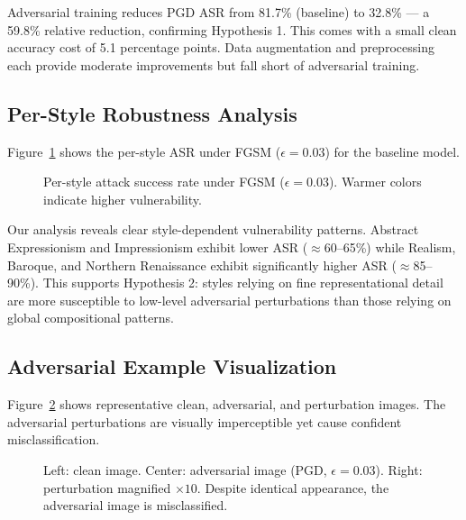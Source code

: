 \documentclass[conference]{IEEEtran}
\begin{document}
Adversarial training reduces PGD ASR from 81.7\% (baseline) to 32.8\% — a 59.8\% relative reduction, confirming Hypothesis 1. This comes with a small clean accuracy cost of 5.1 percentage points. Data augmentation and preprocessing each provide moderate improvements but fall short of adversarial training.

\subsection{Per-Style Robustness Analysis}

Figure~\ref{fig:per_style} shows the per-style ASR under FGSM ($\epsilon = 0.03$) for the baseline model.

\begin{figure}[htbp]
\centering
\caption{Per-style attack success rate under FGSM ($\epsilon=0.03$). Warmer colors indicate higher vulnerability.}
\label{fig:per_style}
\end{figure}

Our analysis reveals clear style-dependent vulnerability patterns. Abstract Expressionism and Impressionism exhibit lower ASR ($\approx$60--65\%) while Realism, Baroque, and Northern Renaissance exhibit significantly higher ASR ($\approx$85--90\%). This supports Hypothesis 2: styles relying on fine representational detail are more susceptible to low-level adversarial perturbations than those relying on global compositional patterns.

\subsection{Adversarial Example Visualization}

Figure~\ref{fig:adv_examples} shows representative clean, adversarial, and perturbation images. The adversarial perturbations are visually imperceptible yet cause confident misclassification.

\begin{figure}[htbp]
\centering
\caption{Left: clean image. Center: adversarial image (PGD, $\epsilon=0.03$). Right: perturbation magnified $\times10$. Despite identical appearance, the adversarial image is misclassified.}
\label{fig:adv_examples}
\end{figure}
\end{document}
